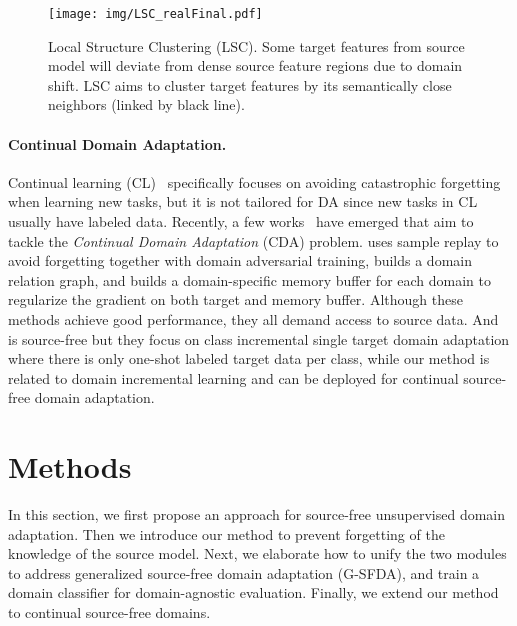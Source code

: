 \documentclass[10pt,twocolumn,letterpaper]{article}
\begin{document}
\begin{figure*}[tbp]
	\centering
	\texttt{[image: img/LSC\_realFinal.pdf]}
	\vspace{-2mm}
	\caption{Local Structure Clustering (LSC). Some target features from source model will deviate from dense source feature regions due to domain shift. LSC aims to cluster target features by its semantically close neighbors (linked by black line).\vspace{-0mm}}
	\label{fig:lsc}
	\vspace{-4mm}
\end{figure*}


\vspace{-2mm}
\paragraph{Continual Domain Adaptation.}
Continual learning (CL)~\cite{kirkpatrick2017overcoming,li2017learning,lopez2017gradient,mallya2018packnet} specifically focuses on avoiding catastrophic forgetting when learning new tasks, but it is not tailored for DA since new tasks in CL usually have labeled data. Recently, a few works~\cite{bobu2018adapting,mancini2019adagraph,su2020gradient} have emerged that aim to tackle the \textit{Continual Domain Adaptation} (CDA) problem. \cite{bobu2018adapting} uses sample replay to avoid forgetting together with domain adversarial training, \cite{mancini2019adagraph} builds a domain relation graph, and \cite{su2020gradient} builds a domain-specific memory buffer for each domain to regularize the gradient on both target and memory buffer. Although these methods achieve good performance, they all demand access to source data. And~\cite{kundu2020class} is source-free but they focus on class incremental single target domain adaptation where there is only one-shot labeled target data per class, while our method is related to domain incremental learning and can be deployed for continual source-free domain adaptation. 



\section{Methods} 
In this section, we first propose an approach for source-free unsupervised domain adaptation. Then we introduce our method to prevent forgetting of the knowledge of the source model. Next, we elaborate how to unify the two modules to address generalized source-free domain adaptation (G-SFDA), and train a domain classifier for domain-agnostic evaluation. Finally, we extend our method to continual source-free domains.
\end{document}
